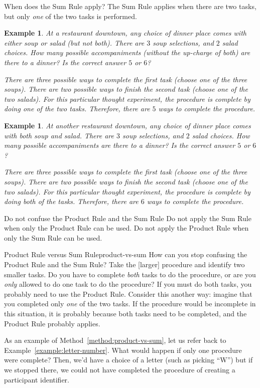 \documentclass{book}
\newcounter{ekcounter}%
\theoremstyle{ekimcustom}
\newtheorem{example}[ekcounter]{Example}
\begin{document}
When does the Sum Rule apply? The Sum Rule applies when there are two tasks, but only \emph{one} of the two tasks is performed.
\begin{example}
At a restaurant downtown, any choice of dinner place comes with either soup or salad (but not both). There are $3$ soup selections, and $2$ salad choices. How many possible accompaniments (without the up-charge of both) are there to a dinner? Is the correct answer $5$ or $6$?

There are three possible ways to complete the first task (choose one of the three soups). There are two possible ways to finish the second task (choose one of the two salads). For this particular thought experiment, the procedure is complete by doing \emph{one} of the two tasks. Therefore, there are $5$ ways to complete the procedure.
\end{example}

\begin{example}
At another restaurant downtown, any choice of dinner place comes with both soup and salad. There are $3$ soup selections, and $2$ salad choices. How many possible accompaniments are there to a dinner? Is the correct answer $5$ or $6$?

There are three possible ways to complete the first task (choose one of the three soups). There are two possible ways to finish the second task (choose one of the two salads). For this particular thought experiment, the procedure is complete by doing \emph{both} of the tasks. Therefore, there are $6$ ways to complete the procedure.
\end{example}

\begin{bwarning}{Do not confuse the Product Rule and the Sum Rule}{}
Do not apply the Sum Rule when only the Product Rule can be used.
Do not apply the Product Rule when only the Sum Rule can be used.
\end{bwarning}

\begin{bmethod}{Product Rule versus Sum Rule}{product-vs-sum}
How can you stop confusing the Product Rule and the Sum Rule? Take the [larger] procedure and identify two smaller tasks. Do you have to complete \emph{both} tasks to do the procedure, or are you \emph{only} allowed to do one task to do the procedure? If you must do both tasks, you probably need to use the Product Rule.
\vskip6pt
Consider this another way: imagine that you completed only \emph{one} of the two tasks. If the procedure would be incomplete in this situation, it is probably because both tasks need to be completed, and the Product Rule probably applies.
\end{bmethod}
As an example of Method~\ref{method:product-vs-sum}, let us refer back to Example~\ref{example:letter-number}. What would happen if only one procedure were complete? Then, we'd have a choice of a letter (such as picking ``W'') but if we stopped there, we could not have completed the procedure of creating a participant identifier.
\end{document}
